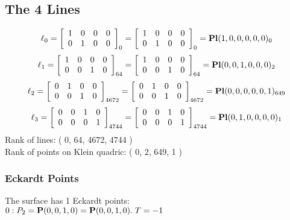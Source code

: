 \documentclass{article}
\newcommand{\bP}{{\bf P}}
\begin{document}
{\subsection*{The 4 Lines}
$$
\ell_{0} = 
\left[
\begin{array}{*{4}{r}}
1 & 0 & 0 & 0\\
0 & 1 & 0 & 0\\
\end{array}
\right]
_{0}
=
\left[
\begin{array}{*{4}c}
1  & 0  & 0  & 0\\
0  & 1  & 0  & 0\\
\end{array}
\right]_{0}
={\rm\bf Pl}(1,0,0,0,0,0 )_{0}$$
$$
\ell_{1} = 
\left[
\begin{array}{*{4}{r}}
1 & 0 & 0 & 0\\
0 & 0 & 1 & 0\\
\end{array}
\right]
_{64}
=
\left[
\begin{array}{*{4}c}
1  & 0  & 0  & 0\\
0  & 0  & 1  & 0\\
\end{array}
\right]_{64}
={\rm\bf Pl}(0,0,1,0,0,0 )_{2}$$
$$
\ell_{2} = 
\left[
\begin{array}{*{4}{r}}
0 & 1 & 0 & 0\\
0 & 0 & 1 & 0\\
\end{array}
\right]
_{4672}
=
\left[
\begin{array}{*{4}c}
0  & 1  & 0  & 0\\
0  & 0  & 1  & 0\\
\end{array}
\right]_{4672}
={\rm\bf Pl}(0,0,0,0,0,1 )_{649}$$
$$
\ell_{3} = 
\left[
\begin{array}{*{4}{r}}
0 & 0 & 1 & 0\\
0 & 0 & 0 & 1\\
\end{array}
\right]
_{4744}
=
\left[
\begin{array}{*{4}c}
0  & 0  & 1  & 0\\
0  & 0  & 0  & 1\\
\end{array}
\right]_{4744}
={\rm\bf Pl}(0,1,0,0,0,0 )_{1}$$
Rank of lines: ( 0, 64, 4672, 4744 )\\
Rank of points on Klein quadric: ( 0, 2, 649, 1 )\\
\subsubsection*{Eckardt Points}
The surface has 1 Eckardt points:\\
$0 : P_{2}=\bP(0, 0, 1, 0) = \bP(0, 0, 1, 0).\; T= -1$\\
}
\end{document}
